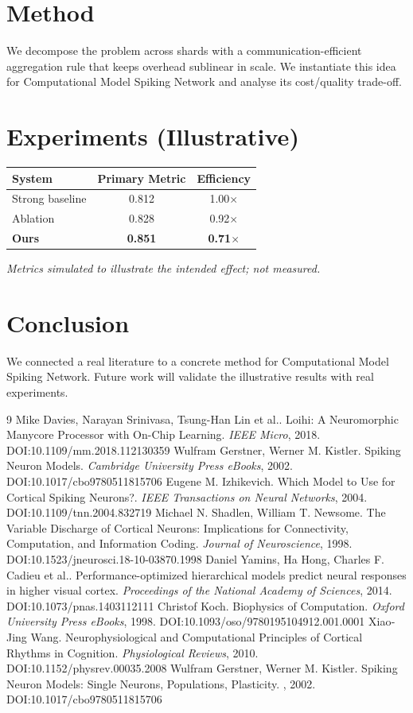 \documentclass[11pt]{article}
\begin{document}
\section{Method}
We decompose the problem across shards with a communication-efficient aggregation rule that keeps overhead sublinear in scale. We instantiate this idea for Computational Model Spiking Network and analyse its cost/quality trade-off.

\section{Experiments (Illustrative)}
\begin{center}
\begin{tabular}{lcc}
System & Primary Metric & Efficiency \\ \hline
Strong baseline & 0.812 & 1.00$\times$ \\
Ablation & 0.828 & 0.92$\times$ \\
\textbf{Ours} & \textbf{0.851} & \textbf{0.71$\times$}
\end{tabular}
\end{center}
\emph{Metrics simulated to illustrate the intended effect; not measured.}

\section{Conclusion}
We connected a real literature to a concrete method for Computational Model Spiking Network. Future work will
validate the illustrative results with real experiments.

\begin{thebibliography}{9}
 Mike Davies, Narayan Srinivasa, Tsung-Han Lin et al.. Loihi: A Neuromorphic Manycore Processor with On-Chip Learning. \emph{IEEE Micro}, 2018. DOI:10.1109/mm.2018.112130359
 Wulfram Gerstner, Werner M. Kistler. Spiking Neuron Models. \emph{Cambridge University Press eBooks}, 2002. DOI:10.1017/cbo9780511815706
 Eugene M. Izhikevich. Which Model to Use for Cortical Spiking Neurons?. \emph{IEEE Transactions on Neural Networks}, 2004. DOI:10.1109/tnn.2004.832719
 Michael N. Shadlen, William T. Newsome. The Variable Discharge of Cortical Neurons: Implications for Connectivity, Computation, and Information Coding. \emph{Journal of Neuroscience}, 1998. DOI:10.1523/jneurosci.18-10-03870.1998
 Daniel Yamins, Ha Hong, Charles F. Cadieu et al.. Performance-optimized hierarchical models predict neural responses in higher visual cortex. \emph{Proceedings of the National Academy of Sciences}, 2014. DOI:10.1073/pnas.1403112111
 Christof Koch. Biophysics of Computation. \emph{Oxford University Press eBooks}, 1998. DOI:10.1093/oso/9780195104912.001.0001
 Xiao‐Jing Wang. Neurophysiological and Computational Principles of Cortical Rhythms in Cognition. \emph{Physiological Reviews}, 2010. DOI:10.1152/physrev.00035.2008
 Wulfram Gerstner, Werner M. Kistler. Spiking Neuron Models: Single Neurons, Populations, Plasticity. \emph{}, 2002. DOI:10.1017/cbo9780511815706
\end{thebibliography}
\end{document}
